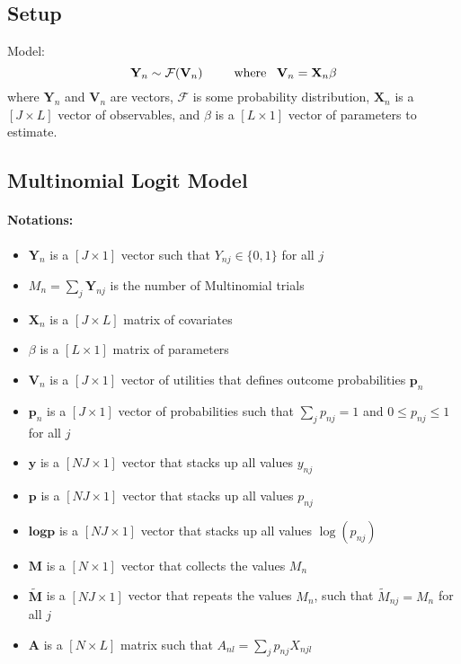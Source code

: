 \documentclass[12pt]{article}
\begin{document}
\subsection{Setup}
Model:
\begin{equation}
	\textbf{Y}_n \sim \mathcal{F}(\textbf{V}_n) \hspace*{25pt} \text{where } \hspace*{5pt} \textbf{V}_n = \textbf{X}_n \beta
\end{equation}
where $\textbf{Y}_n$ and $\textbf{V}_n$ are vectors, $\mathcal{F}$ is some probability distribution, $\textbf{X}_n$ is a $[J \times L]$ vector of observables, and $\beta$ is a $[L \times 1]$ vector of parameters to estimate.


\subsection{Multinomial Logit Model}
\paragraph{Notations:}
\begin{itemize}
	\item $\textbf{Y}_n$ is a $[J \times 1]$ vector such that $Y_{nj} \in \{0,1\}$ for all $j$
	\item $M_n = \sum_j \textbf{Y}_{nj}$ is the number of Multinomial trials
	\item $\textbf{X}_n$ is a $[J \times L]$ matrix of covariates
	\item $\beta$ is a $[L \times 1]$ matrix of parameters
	\item $\textbf{V}_{n}$ is a $[J \times 1]$ vector of utilities that defines outcome probabilities $\textbf{p}_n$
	\item $\textbf{p}_n$ is a $[J \times 1]$ vector of probabilities such that $\sum_j p_{nj} = 1$ and $0 \le p_{nj} \le 1$ for all $j$
	\item $\textbf{y}$ is a $[NJ \times 1]$ vector that stacks up all values $y_{nj}$
	\item $\textbf{p}$ is a $[NJ \times 1]$ vector that stacks up all values $p_{nj}$
	\item $\textbf{logp}$ is a $[NJ \times 1]$ vector that stacks up all values $\log(p_{nj})$
	\item $\textbf{M}$ is a $[N \times 1]$ vector that collects the values $M_n$
	\item $\tilde{\textbf{M}}$ is a $[NJ \times 1]$ vector that repeats the values $M_n$, such that $\tilde{M}_{nj} = M_n$ for all $j$
	\item $\textbf{A}$ is a $[N \times L]$ matrix such that $A_{nl} = \sum_j p_{nj} X_{njl}$
\end{itemize}
\end{document}
